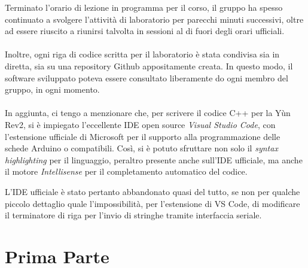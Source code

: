 \documentclass[12pt,a4paper]{article}
\begin{document}
Terminato l'orario di lezione in programma per il corso, il gruppo ha spesso continuato a svolgere l'attività di laboratorio per parecchi minuti successivi, oltre ad essere riuscito a riunirsi talvolta in sessioni al di fuori degli orari ufficiali.
\\ \\
Inoltre, ogni riga di codice scritta per il laboratorio è stata condivisa sia in diretta, sia su una repository Github appositamente creata. In questo modo, il software sviluppato poteva essere consultato liberamente do ogni membro del gruppo, in ogni momento.
\\ \\
In aggiunta, ci tengo a menzionare che, per scrivere il codice C++ per la Yùn Rev2, si è impiegato l'eccellente IDE open source \textit{Visual Studio Code}, con l'estensione ufficiale di Microsoft per il supporto alla programmazione delle schede Arduino o compatibili. Così, si è potuto sfruttare non solo il \textit{syntax highlighting} per il linguaggio, peraltro presente anche sull'IDE ufficiale, ma anche il motore \textit{Intellisense} per il completamento automatico del codice.

L'IDE ufficiale è stato pertanto abbandonato quasi del tutto, se non per qualche piccolo dettaglio quale l'impossibilità, per l'estensione di VS Code, di modificare il terminatore di riga per l'invio di stringhe tramite interfaccia seriale.

\newpage
\section{Prima Parte}
\end{document}
